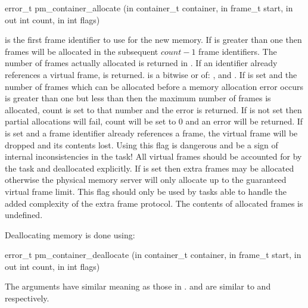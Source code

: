 \begin{code}
error\_t pm\_container\_allocate (in container\_t container, in
frame\_t start, in out int count, in int flags)
\end{code}

\noindent
{} is the first frame identifier to use for the new
memory.  If  is greater than one then frames will be
allocated in the subsequent $count - 1$ frame identifiers.  The number
of frames actually allocated is returned in .  If an
identifier already references a virtual frame,  is
returned.   is a bitwise or of:
,  and
.  If  is
set and the number of frames which can be allocated before a memory
allocation error occurs is greater than one but less than
 then the maximum number of frames is allocated, count
is set to that number and the error is returned.  If
 is not set then partial allocations
will fail, count will be set to 0 and an error will be returned.  If
 is set and a frame identifier already
references a frame, the virtual frame will be dropped and its contents
lost.  Using this flag is dangerous and be a sign of internal
inconsistencies in the task!  All virtual frames should be accounted
for by the task and deallocated explicitly.  If
 is set then extra frames may be
allocated otherwise the physical memory server will only allocate up
to the guaranteed virtual frame limit.  This flag should only be used
by tasks able to handle the added complexity of the extra frame
protocol.  The contents of allocated frames is undefined.


Deallocating memory is done using:

\begin{code}
error\_t pm\_container\_deallocate (in container\_t container, in
frame\_t start, in out int count, in int flags)
\end{code}

\noindent
The arguments have similar meaning as those in
.  
and  are similar to
 and 
respectively.

